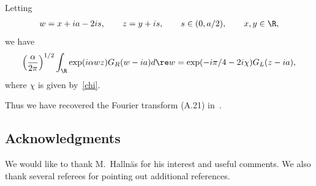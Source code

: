 \documentclass[pdftex]{sigma}
\numberwithin{equation}{section}
\begin{document}
\begin{cor}\label{corollaryC2}
Letting
\begin{gather}
w=x+ia-2is,\qquad z=y+is,\qquad s\in(0,a/2),\qquad x,y\in\R,
\end{gather}
we have
\begin{gather}\label{cor}
\left(\frac{\alpha}{2\pi}\right)^{1/2}\int_{\R} \exp(i\alpha wz)G_R(w-ia)d\re w
=\exp(-i\pi/4-2i\chi)G_L(z-ia),
\end{gather}
where $\chi$ is given by~\eqref{chi}.
\end{cor}

Thus we have recovered the Fourier transform (A.21) in~\cite{Hels}.

\subsection*{Acknowledgments}


We would like to thank M.~Halln\"as for his interest and useful comments. We also thank several referees for pointing out additional references.
\end{document}
